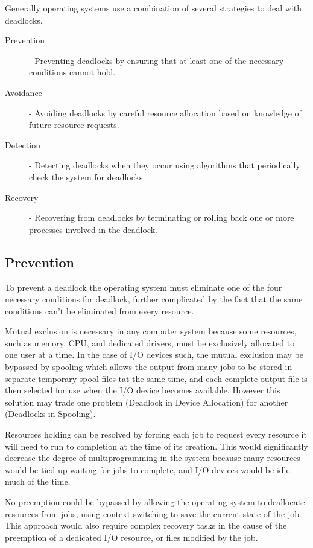 \documentclass[12pt letter]{report}
\begin{document}
Generally operating systems use a combination of several strategies
to deal with deadlocks.
\begin{description}
  \item[Prevention] - Preventing deadlocks by ensuring that at least
    one of the necessary conditions cannot hold.
  \item[Avoidance] - Avoiding deadlocks by careful resource allocation
    based on knowledge of future resource requests.
  \item[Detection] - Detecting deadlocks when they occur using
    algorithms that periodically check the system for deadlocks.
  \item[Recovery] - Recovering from deadlocks by terminating or
    rolling back one or more processes involved in the deadlock.
\end{description}

\subsection{Prevention}

To prevent a deadlock the operating system must eliminate one of the
four necessary conditions for deadlock, further complicated by the
fact that the same conditions can't be eliminated from every resource.


Mutual exclusion is necessary in any computer system because some
resources, such as memory, CPU, and dedicated drivers, must be
exclusively allocated to one user at a time. In the case of I/O
devices such, the mutual exclusion may be bypassed by spooling which
allows the output from many jobs to be stored in separate temporary
spool files tat the same time, and each complete output file is then
selected for use when the I/O device becomes available. However this
solution may trade one problem (Deadlock in Device Allocation) for
another (Deadlocks in Spooling).

Resources holding can be resolved by forcing each job to request
every resource it will need to run to completion at the time of its creation.
This would significantly decrease the degree of multiprogramming in the system
because many resources would be tied up waiting for jobs to complete,
and I/O devices would be idle much of the time.

No preemption could be bypassed by allowing the operating system to
deallocate resources from jobs, using context switching to save the
current state of the job. This approach would also require complex
recovery tasks in the cause of the preemption of a dedicated I/O
resource, or files modified by the job.
\end{document}
